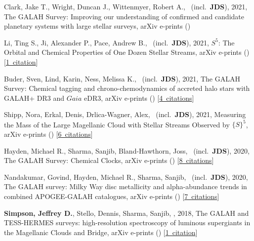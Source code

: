 \item[{\color{numcolor}\scriptsize7}] Clark, Jake T., Wright, Duncan J., Wittenmyer, Robert A., \etal\ (incl.\ \textbf{JDS}), 2021, The GALAH Survey: Improving our understanding of confirmed and candidate planetary systems with large stellar surveys, arXiv e-prints ()

\item[{\color{numcolor}\scriptsize6}] Li, Ting S., Ji, Alexander P., Pace, Andrew B., \etal\ (incl.\ \textbf{JDS}), 2021, $S^5$: The Orbital and Chemical Properties of One Dozen Stellar Streams, arXiv e-prints () [\href{https://ui.adsabs.harvard.edu/#abs/2021arXiv211006950L}{1~citation}]

\item[{\color{numcolor}\scriptsize5}] Buder, Sven, Lind, Karin, Ness, Melissa K., \etal\ (incl.\ \textbf{JDS}), 2021, The GALAH Survey: Chemical tagging and chrono-chemodynamics of accreted halo stars with GALAH+ DR3 and $Gaia$ eDR3, arXiv e-prints () [\href{https://ui.adsabs.harvard.edu/#abs/2021arXiv210904059B}{4~citations}]

\item[{\color{numcolor}\scriptsize4}] Shipp, Nora, Erkal, Denis, Drlica-Wagner, Alex, \etal\ (incl.\ \textbf{JDS}), 2021, Measuring the Mass of the Large Magellanic Cloud with Stellar Streams Observed by ${\{}S{\}}^5$, arXiv e-prints () [\href{https://ui.adsabs.harvard.edu/#abs/2021arXiv210713004S}{6~citations}]

\item[{\color{numcolor}\scriptsize3}] Hayden, Michael R., Sharma, Sanjib, Bland-Hawthorn, Joss, \etal\ (incl.\ \textbf{JDS}), 2020, The GALAH Survey: Chemical Clocks, arXiv e-prints () [\href{https://ui.adsabs.harvard.edu/#abs/2020arXiv201113745H}{8~citations}]

\item[{\color{numcolor}\scriptsize2}] Nandakumar, Govind, Hayden, Michael R., Sharma, Sanjib, \etal\ (incl.\ \textbf{JDS}), 2020, The GALAH survey: Milky Way disc metallicity and alpha-abundance trends in combined APOGEE-GALAH catalogues, arXiv e-prints () [\href{https://ui.adsabs.harvard.edu/#abs/2020arXiv201102783N}{7~citations}]

\item[{\color{numcolor}\scriptsize1}] \textbf{Simpson, Jeffrey D.}, Stello, Dennis, Sharma, Sanjib, \etal, 2018, The GALAH and TESS-HERMES surveys: high-resolution spectroscopy of luminous supergiants in the Magellanic Clouds and Bridge, arXiv e-prints () [\href{https://ui.adsabs.harvard.edu/#abs/2018arXiv180405900S}{1~citation}]